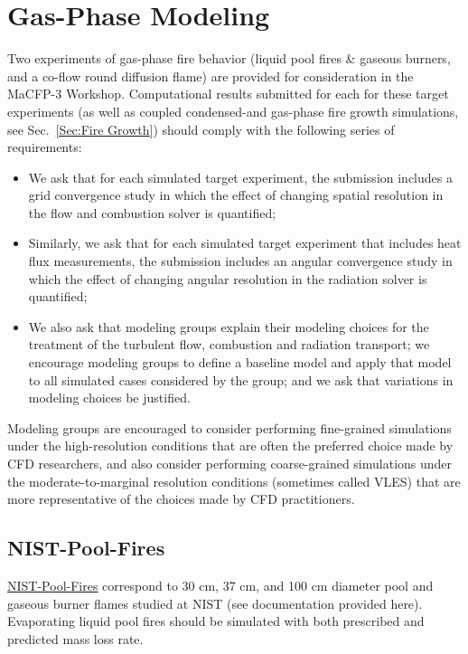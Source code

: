 \documentclass[12pt]{article}
\begin{document}
\clearpage
\section{Gas-Phase Modeling}
\label{Sec:Gas Phase}
Two experiments of gas-phase fire behavior (liquid pool fires \& gaseous burners, and a co-flow round diffusion flame) are provided for consideration in the MaCFP-3 Workshop.  Computational results submitted for each for these target experiments (as well as coupled condensed-and gas-phase fire growth simulations, see Sec.~\ref{Sec:Fire Growth}) should comply with the following series of requirements:

\begin{itemize}[noitemsep]
\item We ask that for each simulated target experiment, the submission includes a grid convergence study in which the effect of changing spatial resolution in the flow and combustion solver is quantified;
\item Similarly, we ask that for each simulated target experiment that includes heat flux measurements, the submission includes an angular convergence study in which the effect of changing angular resolution in the radiation solver is quantified;
\item We also ask that modeling groups explain their modeling choices for the treatment of the turbulent flow, combustion and radiation transport; we encourage modeling groups to define a baseline model and apply that model to all simulated cases considered by the group; and we ask that variations in modeling choices be justified.
 \end{itemize}

Modeling groups are encouraged to consider performing fine-grained simulations under the high-resolution conditions that are often the preferred choice made by CFD researchers, and also consider performing coarse-grained simulations under the moderate-to-marginal resolution conditions (sometimes called VLES) that are more representative of the choices made by CFD practitioners.

\subsection{NIST-Pool-Fires}
\href{https://github.com/MaCFP/macfp-db/tree/master/Liquid_Pool_Fires/NIST_Pool_Fires}{NIST-Pool-Fires} correspond to 30 cm, 37 cm, and 100 cm diameter pool and gaseous burner flames studied at NIST (see documentation provided here). Evaporating liquid pool fires should be simulated with both prescribed and predicted mass loss rate.
\end{document}
